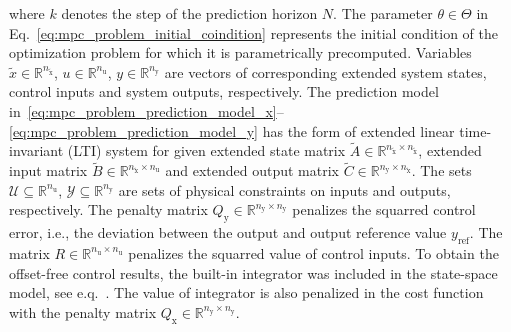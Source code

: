 \documentclass[preprint,12pt]{elsarticle}
\begin{document}
where $k$ denotes the step of the prediction horizon $N$. The parameter $\theta \in \Theta$ in Eq.~\eqref{eq:mpc_problem_initial_coindition} represents the initial condition of the optimization problem for which it is parametrically precomputed. Variables $\widetilde{x} \in \mathbb{R}^{n_{\widetilde{\mathrm{x}}}}$, $u \in \mathbb{R}^{n_{\mathrm{u}}}$, $y \in \mathbb{R}^{n_{\mathrm{y}}}$ are vectors of corresponding extended system states, control inputs and system outputs, respectively. The prediction model in~\eqref{eq:mpc_problem_prediction_model_x}--\eqref{eq:mpc_problem_prediction_model_y} has the form of extended linear time-invariant (LTI) system for given extended state matrix $\widetilde{A} \in \mathbb{R}^{n_{\widetilde{\mathrm{x}}} \times n_{\widetilde{\mathrm{x}}}}$, extended input matrix $\widetilde{B} \in \mathbb{R}^{n_{\widetilde{\mathrm{x}}} \times n_{\mathrm{u}}}$ and extended output matrix $\widetilde{C} \in \mathbb{R}^{n_{\mathrm{y}} \times n_{\widetilde{\mathrm{x}}}}$. The sets $\mathcal{U} \subseteq \mathbb{R}^{n_{\mathrm{u}}}$, $\mathcal{Y} \subseteq \mathbb{R}^{n_{\mathrm{y}}}$ are sets of physical constraints on inputs and outputs, respectively. The penalty matrix $Q_\mathrm{y} \in \mathbb{R}^{n_{\mathrm{y}} \times n_{\mathrm{y}}}$ penalizes the squarred control error, i.e., the deviation between the output and output reference value $y_\mathrm{ref}$. The matrix $R \in \mathbb{R}^{n_{\mathrm{u}} \times n_{\mathrm{u}}}$ penalizes the squarred value of control inputs. To obtain the offset-free control results, the built-in integrator was included in the state-space model, see e.q.~\cite{Ruscio_MPC_integral}. The value of integrator is also penalized in the cost function with the penalty matrix $Q_\mathrm{x} \in \mathbb{R}^{n_{\mathrm{y}} \times n_{\mathrm{y}}}$.
\end{document}
